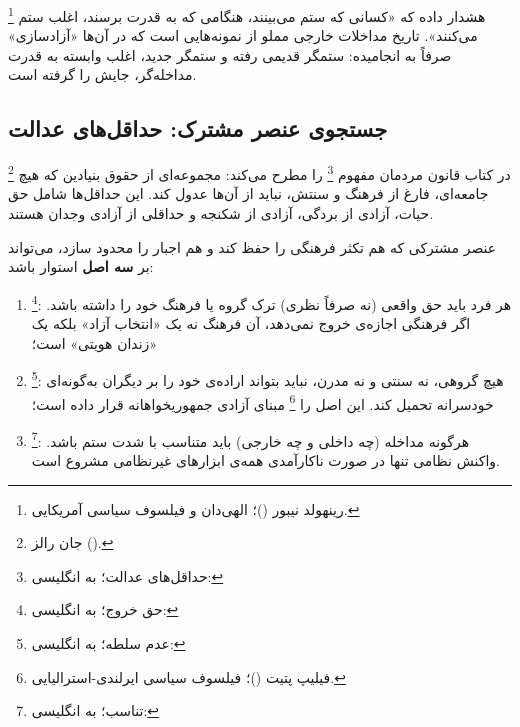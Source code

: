 %
\footnote{%
	رینهولد نیبور ()؛%
	الهی‌دان و فیلسوف سیاسی آمریکایی.%
}%
هشدار داده که «کسانی که ستم می‌بینند، هنگامی که به قدرت برسند،
اغلب ستم
می‌کنند».
تاریخ مداخلات خارجی مملو از نمونه‌هایی است که در آن‌ها «آزادسازی»
صرفاً به  انجامیده: ستمگر قدیمی رفته و
ستمگر جدید، اغلب وابسته به قدرت مداخله‌گر، جایش را گرفته است.

\subsection{جستجوی عنصر مشترک: حداقل‌های عدالت}
\label{subsec:ch02-t5-minimum}

%
\footnote{جان رالز ().}%
در کتاب قانون مردمان مفهوم
%
\footnote{حداقل‌های عدالت؛ به انگلیسی: }%
را مطرح می‌کند: مجموعه‌ای از حقوق بنیادین که هیچ جامعه‌ای،
فارغ از فرهنگ و سنتش، نباید از آن‌ها عدول
کند.
این حداقل‌ها شامل حق حیات، آزادی از بردگی، آزادی از شکنجه و
حداقلی از آزادی وجدان هستند.

\begin{tcolorbox}[wavebox, title={پیشنهاد تحلیلی}]
	عنصر مشترکی که هم تکثر فرهنگی را حفظ کند و هم اجبار را محدود
	سازد، می‌تواند بر \textbf{سه اصل} استوار باشد:
	\begin{enumerate}[label=\textbf{\arabic*.}, nosep, rightmargin=1em]
		\item {}%
		\footnote{حق خروج؛ به انگلیسی: }: هر فرد
		باید حق واقعی (نه صرفاً نظری) ترک گروه یا فرهنگ خود را
		داشته باشد. اگر فرهنگی اجازه‌ی خروج نمی‌دهد، آن فرهنگ نه
		یک «انتخاب آزاد» بلکه یک «زندان هویتی»
		است؛
		\item {}%
		\footnote{عدم سلطه؛ به انگلیسی: }:
		هیچ گروهی، نه سنتی و نه مدرن، نباید بتواند اراده‌ی خود
		را بر دیگران به‌گونه‌ای خودسرانه تحمیل کند. این اصل را
		\footnote{فیلیپ پتیت ()؛
			فیلسوف سیاسی ایرلندی-استرالیایی.}%
		مبنای آزادی جمهوریخواهانه قرار داده
		است؛
		\item {}%
		\footnote{تناسب؛ به انگلیسی: }:
		هرگونه مداخله (چه داخلی و چه خارجی) باید متناسب با شدت ستم
		باشد. واکنش نظامی تنها در صورت ناکارآمدی همه‌ی ابزارهای
		غیرنظامی مشروع
		است.
	\end{enumerate}
\end{tcolorbox}



